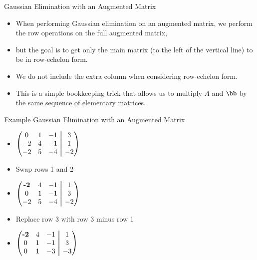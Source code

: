 \documentclass{beamer}
\begin{document}

\begin{frame}{Gaussian Elimination with an Augmented Matrix}

\begin{itemize}
\item When performing Gaussian elimination on an augmented matrix, we perform
the row operations on the full augmented matrix,
\item but the goal is to get only the main matrix (to the left of the vertical line)
to be in row-echelon form.
\item We do not include the extra column when considering row-echelon form.
\item This is a simple bookkeeping trick that allows us to multiply $A$ and $\bb$
by the same sequence of elementary matrices.
\end{itemize}
\end{frame}


\begin{frame}{Example Gaussian Elimination with an Augmented Matrix}

\begin{itemize}
\item $
\begin{pmatrix}
 0 & 1 & -1  &  \aug & 3  \\
-2 & 4 & -1  &  \aug & 1  \\
-2 & 5 & -4  &  \aug & -2  \\
\end{pmatrix}
$
\item Swap rows 1 and 2
\item $
\begin{pmatrix}
\textbf{-2} & 4 & -1  &  \aug & 1  \\
        0   & 1 & -1  &  \aug & 3  \\
        -2  & 5 & -4  &  \aug & -2  \\
\end{pmatrix}
$
\item Replace row 3 with row 3 minus row 1
\item $
\begin{pmatrix}
\textbf{-2} & 4 & -1  &  \aug & 1  \\
        0   & 1 & -1  &  \aug & 3  \\
        0   & 1 & -3  &  \aug & -3  \\
\end{pmatrix}
$
\end{itemize}
\end{frame}
\end{document}
